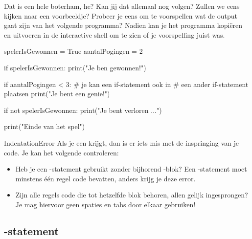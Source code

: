 \begin{letsTryOut}
	Dat is een hele boterham, he?
	Kan jij dat allemaal nog volgen?
	Zullen we eens kijken naar een voorbeeldje?
	Probeer je eens om te voorspellen wat de output gaat zijn van het volgende programma?
	\newline
	Nadien kan je het programma kopiëren en uitvoeren in de interactive shell om te zien of je voorspelling juist was.
\begin{pyEnv}
spelerIsGewonnen = True
aantalPogingen = 2

if spelerIsGewonnen:
	print("Je ben gewonnen!")
	
	if aantalPogingen < 3:
		# je kan een if-statement ook in
		# een ander if-statement plaatsen
		print("Je bent een genie!")

if not spelerIsGewonnen:
	print("Je bent verloren ...")

print("Einde van het spel")
\end{pyEnv}
\end{letsTryOut}

\begin{firstAidToErrors}{IndentationError}
	Als je een  krijgt, dan is er iets mis met de inspringing van je code.
	Je kan het volgende controleren:
	\begin{itemize}
		\item
			Heb je een -statement gebruikt zonder bijhorend -blok?
			Een -statement moet minstens één regel code bevatten,
			anders krijg je deze error.
		\item
			Zijn alle regels code die tot hetzelfde blok behoren, allen gelijk ingesprongen?
			Je mag hiervoor geen spaties en tabs door elkaar gebruiken!
	\end{itemize}
\end{firstAidToErrors}

\subsection{-statement}

